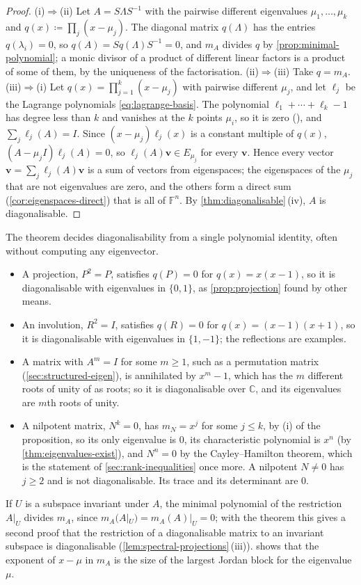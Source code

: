 \begin{proof}
(i)$\Rightarrow$(ii) Let $A=S\Lambda S^{-1}$ with the pairwise different eigenvalues $\mu_1,\ldots,\mu_k$ and $q(x)\coloneqq\prod_j(x-\mu_j)$. The diagonal matrix $q(\Lambda)$ has the entries $q(\lambda_i)=0$, so $q(A)=Sq(\Lambda)S^{-1}=0$, and $m_A$ divides $q$ by \cref{prop:minimal-polynomial}; a monic divisor of a product of different linear factors is a product of some of them, by the uniqueness of the factorisation. (ii)$\Rightarrow$(iii) Take $q=m_A$. (iii)$\Rightarrow$(i) Let $q(x)=\prod_{j=1}^k(x-\mu_j)$ with pairwise different $\mu_j$, and let $\ell_j$ be the Lagrange polynomials \eqref{eq:lagrange-basis}. The polynomial $\ell_1+\cdots+\ell_k-1$ has degree less than $k$ and vanishes at the $k$ points $\mu_i$, so it is zero (), and $\sum_j\ell_j(A)=I$. Since $(x-\mu_j)\ell_j(x)$ is a constant multiple of $q(x)$, $(A-\mu_jI)\ell_j(A)=0$, so $\ell_j(A)\mathbf v\in E_{\mu_j}$ for every $\mathbf v$. Hence every vector $\mathbf v=\sum_j\ell_j(A)\mathbf v$ is a sum of vectors from eigenspaces; the eigenspaces of the $\mu_j$ that are not eigenvalues are zero, and the others form a direct sum (\cref{cor:eigenspaces-direct}) that is all of $\mathbb F^n$. By \cref{thm:diagonalisable}\,(iv), $A$ is diagonalisable.
\end{proof}

The theorem decides diagonalisability from a single polynomial identity, often without computing any eigenvector.
\begin{itemize}
\item A projection, $P^2=P$, satisfies $q(P)=0$ for $q(x)=x(x-1)$, so it is diagonalisable with eigenvalues in $\{0,1\}$, as \cref{prop:projection} found by other means.
\item An involution, $R^2=I$, satisfies $q(R)=0$ for $q(x)=(x-1)(x+1)$, so it is diagonalisable with eigenvalues in $\{1,-1\}$; the reflections are examples.
\item A matrix with $A^m=I$ for some $m\ge1$, such as a permutation matrix (\cref{sec:structured-eigen}), is annihilated by $x^m-1$, which has the $m$ different roots of unity of  as roots; so it is diagonalisable over $\mathbb C$, and its eigenvalues are $m$th roots of unity.
\item A nilpotent matrix, $N^k=0$, has $m_N=x^j$ for some $j\le k$, by (i) of the proposition, so its only eigenvalue is $0$, its characteristic polynomial is $x^n$ (by \cref{thm:eigenvalues-exist}), and $N^n=0$ by the Cayley--Hamilton theorem, which is the statement of \cref{sec:rank-inequalities} once more. A nilpotent $N\ne0$ has $j\ge2$ and is not diagonalisable. Its trace and its determinant are $0$.
\end{itemize}
If $U$ is a subspace invariant under $A$, the minimal polynomial of the restriction $A|_U$ divides $m_A$, since $m_A(A|_U)=m_A(A)|_U=0$; with the theorem this gives a second proof that the restriction of a diagonalisable matrix to an invariant subspace is diagonalisable (\cref{lem:spectral-projections}\,(iii)).  shows that the exponent of $x-\mu$ in $m_A$ is the size of the largest Jordan block for the eigenvalue $\mu$.

